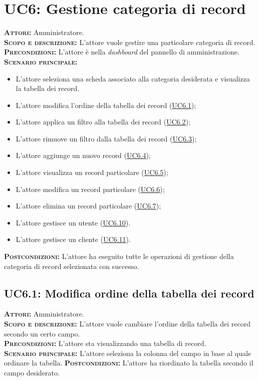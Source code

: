 \section{UC6: Gestione categoria di record}
\label{sec:UC6}
\textsc{\textbf{Attori:}} Amministratore.\\
\textsc{\textbf{Scopo e descrizione:}} L'attore vuole gestire una particolare categoria di record.\\
\textsc{\textsc{\textbf{Precondizioni:}}} L'attore è nella \textit{dashboard} del pannello di amministrazione.\\
\textsc{\textbf{Scenario principale:}} 
\begin{itemize}
    \item L'attore seleziona una scheda associato alla categoria desiderata e visualizza la tabella dei record.
    \item L'attore modifica l'ordine della tabella dei record (\hyperref[sec:UC61]{UC6.1});
    \item L'attore applica un filtro alla tabella dei record (\hyperref[sec:UC62]{UC6.2});
    \item L'attore rimuove un filtro dalla tabella dei record (\hyperref[sec:UC63]{UC6.3});
    \item L'attore aggiunge un nuovo record (\hyperref[sec:UC64]{UC6.4});
    \item L'attore visualizza un record particolare (\hyperref[sec:UC65]{UC6.5});
    \item L'attore modifica un record particolare (\hyperref[sec:UC66]{UC6.6});
    \item L'attore elimina un record particolare (\hyperref[sec:UC67]{UC6.7});
    \item L'attore gestisce un utente (\hyperref[UC610]{UC6.10}).
    \item L'attore gestisce un cliente (\hyperref[UC611]{UC6.11}).
\end{itemize}
\textsc{\textbf{Postcondizioni:}} L'attore ha eseguito tutte le operazioni di gestione della categoria di record selezionata con successo.

\subsection{UC6.1: Modifica ordine della tabella dei record}
\label{sec:UC61}
\textsc{\textbf{Attori:}} Amministratore.\\
\textsc{\textbf{Scopo e descrizione:}} L'attore vuole cambiare l'ordine della tabella dei record secondo un certo campo.\\
\textsc{\textsc{\textbf{Precondizioni:}}} L'attore sta visualizzando una tabella di record.\\
\textsc{\textbf{Scenario principale:}} L'attore seleziona la colonna del campo in base al quale ordinare la tabella.
\textsc{\textbf{Postcondizioni:}} L'attore ha riordinato la tabella secondo il campo desiderato.

